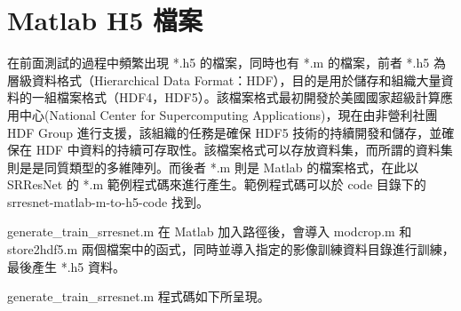 \documentclass[11pt,UTF8]{ctexart}
\begin{document}
\section{Matlab H5 檔案}


在前面測試的過程中頻繁出現 *.h5 的檔案，同時也有 *.m 的檔案，前者 *.h5 為層級資料格式（Hierarchical Data Format：HDF），目的是用於儲存和組織大量資料的一組檔案格式（HDF4，HDF5）。該檔案格式最初開發於美國國家超級計算應用中心(National Center for Supercomputing Applications)，現在由非營利社團 HDF Group 進行支援，該組織的任務是確保 HDF5 技術的持續開發和儲存，並確保在 HDF 中資料的持續可存取性。該檔案格式可以存放資料集，而所謂的資料集則是是同質類型的多維陣列。而後者 *.m 則是 Matlab 的檔案格式，在此以 SRResNet 的 *.m 範例程式碼來進行產生。範例程式碼可以於 code 目錄下的 srresnet-matlab-m-to-h5-code 找到。

generate\_train\_srresnet.m 在 Matlab 加入路徑後，會導入 modcrop.m 和 store2hdf5.m 兩個檔案中的函式，同時並導入指定的影像訓練資料目錄進行訓練，最後產生 *.h5 資料。

generate\_train\_srresnet.m 程式碼如下所呈現。
\end{document}
